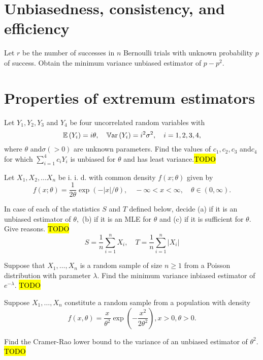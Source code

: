 \section{Unbiasedness, consistency, and efficiency}
\begin{example}
\label{exa:isi2008samplepsb11} Let $r$ be the number of successes
in $n$ Bernoulli trials with unknown probability $p$ of success.
Obtain the minimum variance unbiased estimator of $p-p^{2}$.
\end{example}


\section{Properties of extremum estimators}
\begin{example}
\label{exa:isi2004samplepsb6}Let $Y_{1},Y_{2},Y_{3}$ and $Y_{4}$
be four uncorrelated random variables with 
\[
\mathbb{E}\left(Y_{i}\right)=i\theta,\quad\mathbb{V\mathrm{ar}}\left(Y_{i}\right)=i^{2}\sigma^{2},\quad i=1,2,3,4,
\]
 where $\theta$ and$\sigma(>0)$ are unknown parameters. Find the
values of $c_{1},c_{2},c_{3}$ and$c_{4}$ for which $\sum_{i=1}^{4}c_{i}Y_{i}$
is unbiased for $\theta$ and has least variance.\hl{TODO}
\end{example}

\begin{example}
\label{exa:isi2004samplepsb8}Let $X_{1},X_{2},\ldots X_{n}$ be i.
i. d. with common density $f(x;\theta)$ given by 
\[
f(x;\theta)=\frac{1}{2\theta}\exp(-|x|/\theta),\quad-\infty<x<\infty,\quad\theta\in(0,\infty).
\]

In case of each of the statistics $S$ and $T$ defined below, decide
(a) if it is an unbiased estimator of $\theta,$ (b) if it is an MLE
for $\theta$ and (c) if it is sufficient for $\theta$. Give reasons.
\hl{TODO}
\[
S=\frac{1}{n}\sum_{i=1}^{n}X_{i},\quad T=\frac{1}{n}\sum_{i=1}^{n}\left|X_{i}\right|
\]
\end{example}

\begin{example}
\label{exa:isi2005samplepsb7}Suppose that $X_{1},\ldots,X_{n}$ is
a random sample of size $n\geq1$ from a Poisson distribution with
parameter $\lambda$. Find the minimum variance inbiased estimator
of $e^{-\lambda}$. \hl{TODO}
\end{example}

\begin{example}
\label{exa:isi2005samplepsb8}Suppose $X_{1},\ldots,X_{n}$ constitute
a random sample from a population with density 
\[
f(x,\theta)=\frac{x}{\theta^{2}}\exp\left(-\frac{x^{2}}{2\theta^{2}}\right),x>0,\theta>0.
\]

Find the Cramer-Rao lower bound to the variance of an unbiased estimator
of $\theta^{2}$. \hl{TODO}
\end{example}


